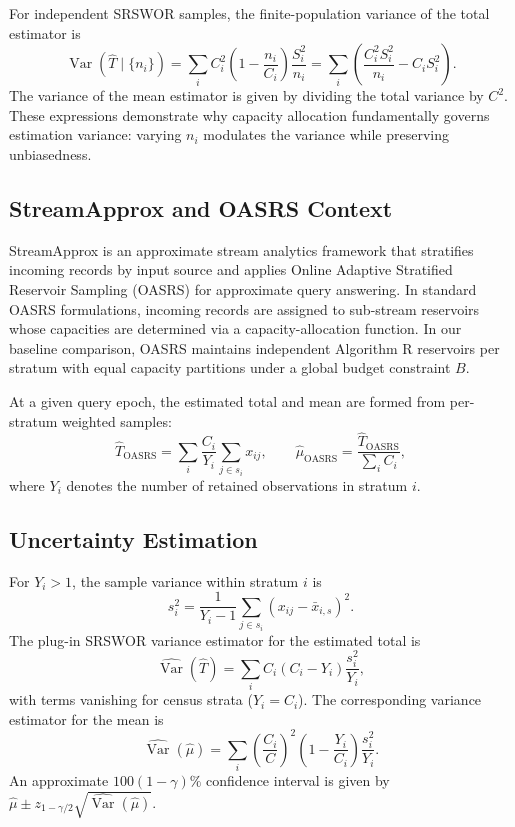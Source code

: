 \documentclass[conference]{IEEEtran}
\begin{document}
For independent SRSWOR samples, the finite-population variance of the total estimator is
\begin{equation}
 \operatorname{Var}(\widehat{T}\mid\{n_i\})
 =\sum_i C_i^2\left(1-\frac{n_i}{C_i}\right)\frac{S_i^2}{n_i}
 =\sum_i\left(\frac{C_i^2S_i^2}{n_i}-C_iS_i^2\right).
 \label{eq:strat-var}
\end{equation}
The variance of the mean estimator is given by dividing the total variance by $C^2$. These expressions demonstrate why capacity allocation fundamentally governs estimation variance: varying $n_i$ modulates the variance while preserving unbiasedness.

\subsection{StreamApprox and OASRS Context}

StreamApprox is an approximate stream analytics framework that stratifies incoming records by input source and applies Online Adaptive Stratified Reservoir Sampling (OASRS) for approximate query answering. In standard OASRS formulations, incoming records are assigned to sub-stream reservoirs whose capacities are determined via a capacity-allocation function. In our baseline comparison, OASRS maintains independent Algorithm R reservoirs per stratum with equal capacity partitions under a global budget constraint $B$.

At a given query epoch, the estimated total and mean are formed from per-stratum weighted samples:
\begin{equation}
 \widehat{T}_{\mathrm{OASRS}}=\sum_i\frac{C_i}{Y_i}\sum_{j\in s_i}x_{ij},\qquad
 \widehat{\mu}_{\mathrm{OASRS}}=\frac{\widehat{T}_{\mathrm{OASRS}}}{\sum_i C_i},
 \label{eq:expansion}
\end{equation}
where $Y_i$ denotes the number of retained observations in stratum $i$.

\subsection{Uncertainty Estimation}

For $Y_i>1$, the sample variance within stratum $i$ is
\begin{equation}
 s_i^2=\frac{1}{Y_i-1}\sum_{j\in s_i}(x_{ij}-\bar{x}_{i,s})^2.
\end{equation}
The plug-in SRSWOR variance estimator for the estimated total is
\begin{equation}
 \widehat{\operatorname{Var}}(\widehat{T})
 =\sum_i C_i(C_i-Y_i)\frac{s_i^2}{Y_i},
 \label{eq:total-var-est}
\end{equation}
with terms vanishing for census strata ($Y_i=C_i$). The corresponding variance estimator for the mean is
\begin{equation}
 \widehat{\operatorname{Var}}(\widehat{\mu})
 =\sum_i\left(\frac{C_i}{C}\right)^2
   \left(1-\frac{Y_i}{C_i}\right)\frac{s_i^2}{Y_i}.
\end{equation}
An approximate $100(1-\gamma)\%$ confidence interval is given by $\widehat{\mu} \pm z_{1-\gamma/2}\sqrt{\widehat{\operatorname{Var}}(\widehat{\mu})}$.
\end{document}
